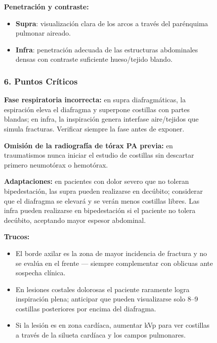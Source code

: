 \begin{figure}
{\textbf{Penetración y contraste:}
\begin{itemize}
  \item \textbf{Supra}: visualización clara de los arcos a través del parénquima pulmonar aireado.
  \item \textbf{Infra}: penetración adecuada de las estructuras abdominales densas con contraste suficiente hueso/tejido blando.
\end{itemize}

\subsubsection*{6. Puntos Críticos}

\textbf{Fase respiratoria incorrecta:} en supra diafragmáticas, la espiración eleva el diafragma y superpone costillas con partes blandas; en infra, la inspiración genera interfase aire/tejidos que simula fracturas. Verificar siempre la fase antes de exponer.

\textbf{Omisión de la radiografía de tórax PA previa:} en traumatismos nunca iniciar el estudio de costillas sin descartar primero neumotórax o hemotórax.

\textbf{Adaptaciones:} en pacientes con dolor severo que no toleran bipedestación, las supra pueden realizarse en decúbito; considerar que el diafragma se elevará y se verán menos costillas libres. Las infra pueden realizarse en bipedestación si el paciente no tolera decúbito, aceptando mayor espesor abdominal.

\textbf{Trucos:}
\begin{itemize}
  \item El borde axilar es la zona de mayor incidencia de fractura y no se evalúa en el frente — siempre complementar con oblicuas ante sospecha clínica.
  \item En lesiones costales dolorosas el paciente raramente logra inspiración plena; anticipar que pueden visualizarse solo 8--9 costillas posteriores por encima del diafragma.
  \item Si la lesión es en zona cardíaca, aumentar kVp para ver costillas a través de la silueta cardíaca y los campos pulmonares.
\end{itemize}

\clearpage


}
\end{figure}
